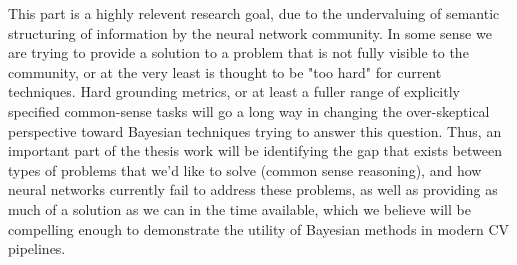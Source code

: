 This part is a highly relevent research goal, due to the undervaluing of
semantic structuring of information by the neural network community. In some
sense we are trying to provide a solution to a problem that is not fully
visible to the community, or at the very least is thought to be "too hard" for
current techniques. Hard grounding metrics, or at least a fuller range of
explicitly specified common-sense tasks will go a long way in changing the
over-skeptical perspective toward Bayesian techniques trying to answer this
question. Thus, an important part of the thesis work will be identifying the
gap that exists between types of problems that we'd like to solve (common sense
reasoning), and how neural networks currently fail to address these problems,
as well as providing as much of a solution as we can in the time available,
which we believe will be compelling enough to demonstrate the utility of
Bayesian methods in modern CV pipelines.
